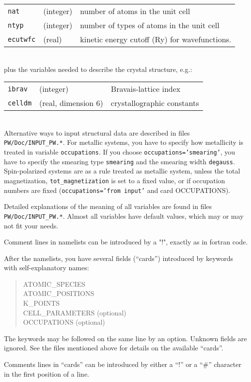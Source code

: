 \documentclass[12pt,a4paper]{article}
\begin{document}
\begin{tabular}{lll}
      \texttt{nat} &(integer)& number of atoms in the unit cell\\
      \texttt{ntyp} &(integer)& number of types of atoms in the unit cell\\
      \texttt{ecutwfc} &(real)& kinetic energy cutoff (Ry) for wavefunctions.
\end{tabular}    \\
plus the variables needed to describe the crystal structure, e.g.:
\begin{tabular}{lll}
      \texttt{ibrav} & (integer)& Bravais-lattice index\\
      \texttt{celldm} &(real, dimension 6)& crystallographic constants
\end{tabular}    \\
Alternative ways to input structural data are described in files
\texttt{PW/Doc/INPUT\_PW.*}. For metallic systems, you have to specify
how metallicity is treated in variable \texttt{occupations}.
If you choose \texttt{occupations='smearing'}, you have
to specify the smearing type \texttt{smearing} and the smearing width 
\texttt{degauss}. Spin-polarized systems are as a rule treated as metallic 
system, unless the total magnetization, \texttt{tot\_magnetization}
is set to a fixed value, or if occupation numbers are fixed
(\texttt{occupations='from input'} and card OCCUPATIONS).
    
Detailed explanations of the meaning of all variables are found in files
\texttt{PW/Doc/INPUT\_PW.*}. Almost all variables have default 
values, which may or may not fit your needs.

Comment lines in namelists can be introduced by a "!", exactly as in fortran 
code.
    
After the namelists, you have several fields (``cards'')
introduced by keywords with self-explanatory names:
\begin{quote}
       ATOMIC\_SPECIES\\
       ATOMIC\_POSITIONS\\
       K\_POINTS\\
       CELL\_PARAMETERS (optional)\\
       OCCUPATIONS (optional)\\
\end{quote}
The keywords may be followed on the same line by an option. Unknown
fields are ignored. 
See the files mentioned above for details on the available ``cards''.

Comments lines in ``cards'' can be introduced by either a ``!'' or a ``\#''
character in the first position of a line.
 
\end{document}
